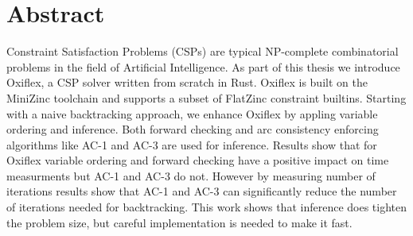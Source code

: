 
\chapter*{Abstract}

Constraint Satisfaction Problems (CSPs) are typical NP-complete combinatorial problems in the field of Artificial Intelligence. As part of this thesis we introduce Oxiflex, a CSP solver written from scratch in Rust. Oxiflex is built on the MiniZinc toolchain and supports a subset of FlatZinc constraint builtins. Starting with a naive backtracking approach, we enhance Oxiflex by appling variable ordering and inference. Both forward checking and arc consistency enforcing algorithms like AC-1 and AC-3 are used for inference. Results show that for Oxiflex variable ordering and forward checking have a positive impact on time measurments but AC-1 and AC-3 do not. However by measuring number of iterations results show that AC-1 and AC-3 can significantly reduce the number of iterations needed for backtracking. This work shows that inference does tighten the problem size, but careful implementation is needed to make it fast.

